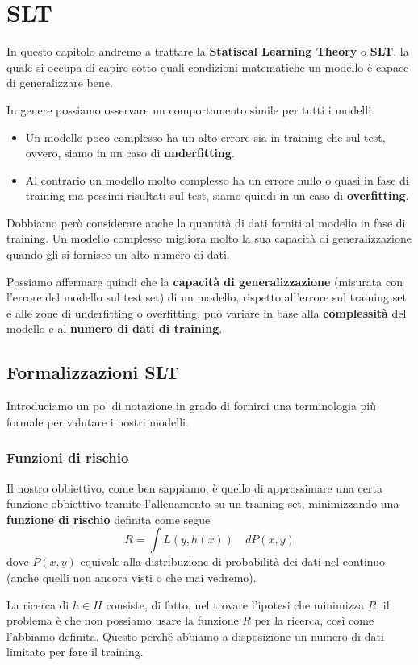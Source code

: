 \chapter{SLT}
In questo capitolo andremo a trattare la \textbf{Statiscal Learning Theory} o \textbf{SLT}, la quale si occupa di capire
sotto quali condizioni matematiche un modello \`e capace di generalizzare bene.

In genere possiamo osservare un comportamento simile per tutti i modelli.
\begin{itemize}
	\item Un modello poco complesso ha un alto errore sia in training che sul test, ovvero, siamo in un caso di
	      \textbf{underfitting}.
	\item Al contrario un modello molto complesso ha un errore nullo o quasi in fase di training ma pessimi risultati sul
	      test, siamo quindi in un caso di \textbf{overfitting}.
\end{itemize}
Dobbiamo per\`o considerare anche la quantit\`a di dati forniti al modello in fase di training. Un modello complesso
migliora molto la sua capacit\`a di generalizzazione quando gli si fornisce un alto numero di dati.

Possiamo affermare quindi che la \textbf{capacit\`a di generalizzazione} (misurata con l'errore del modello sul test set)
di un modello, rispetto all'errore sul training set e alle zone di underfitting o overfitting, pu\`o variare in base alla
\textbf{complessit\`a} del modello e al \textbf{numero di dati di training}.

\section{Formalizzazioni SLT}
Introduciamo un po' di notazione in grado di fornirci una terminologia pi\`u formale per valutare i nostri modelli.

\subsection{Funzioni di rischio}
Il nostro obbiettivo, come ben sappiamo, \`e quello di approssimare una certa funzione obbiettivo tramite l'allenamento
su un training set, minimizzando una \textbf{funzione di rischio} definita come segue
\[ R = \int L(y, h(x)) \quad d P(x, y) \]
dove $P(x, y)$ equivale alla distribuzione di probabilit\`a dei dati nel continuo (anche quelli non ancora visti o che mai
vedremo).

La ricerca di $h \in H$ consiste, di fatto, nel trovare l'ipotesi che minimizza $R$, il problema \`e che non possiamo
usare la funzione $R$ per la ricerca, cos\`i come l'abbiamo definita. Questo perch\'e abbiamo a disposizione un numero
di dati limitato per fare il training.

